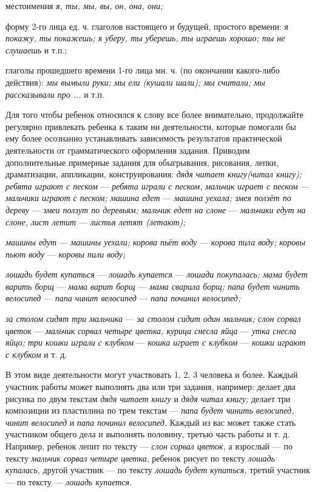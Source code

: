 \documentclass[a5paper]{book}
\renewcommand{\emph}[1]{\textit{#1}}
\begin{document}
местоимения \emph{я, ты, мы, вы, он, она, они;}

форму 2-го лица ед. ч. глаголов настоящего и будущей, простого времени:
я \emph{покажу, ты покажешь; я уберу, ты уберешь, ты играешь хорошо; ты
не слушаешь} и т.п.;

глаголы прошедшего времени 1-го лица мн. ч. (по окончании какого-либо
действия): \emph{мы вымыли руки; мы ели (кушали шали); мы считали; мы
рассказывали про ...} и т.п.

Для того чтобы ребенок относился к слову все более внимательно,
продолжайте регулярно привлекать ребенка к таким ни деятельности,
которые помогали бы ему более осознанно устанавливать зависимость
результатов практической деятельности от грамматического оформления
задания. Приводим дополнительные примерные задания для обыгрывания,
рисования, лепки, драматизации, аппликации, конструирования: \emph{дядя
читает книгу(читал книгу); ребята играют с песком} --- \emph{ребята
играли с песком,} \emph{мальчик играет с песком} --- \emph{мальчики
играют с песком; машина едет} --- \emph{машина уехала; змея ползёт по
дереву} --- \emph{змеи ползут по деревьям; мальчик едет на слоне} ---
\emph{мальчики едут на слоне, лист летит} --- \emph{листья летят
(летают);}

\emph{машины едут} --- \emph{машины уехали; корова пьёт воду} ---
\emph{корова пила воду; коровы пьют воду} --- \emph{коровы пили воду;}

\emph{лошадь будет купаться} --- \emph{лошадь купается} --- \emph{лошади
покупалась; мама будет варить борщ} --- \emph{мама варит борщ} ---
\emph{мама сварила борщ; папа будет чинить велосипед} --- \emph{папа
чинит велосипед} --- \emph{папа починил велосипед;}

\emph{за столом сидят три мальчика} --- \emph{за столом сидит один
мальчик; слон сорвал цветок} --- \emph{мальчик сорвал четыре цветка,
курица снесла яйца} --- \emph{утка снесла яйцо; три кошки играли}
\emph{с клубком} --- \emph{кошка играет с клубком} --- \emph{кошки
играют с клубком} и т. д.

В этом виде деятельности могут участвовать 1, 2, 3 человека и более.
Каждый участник работы может выполнять два или три задания, например:
делает два рисунка по двум текстам \emph{дядя читает книгу} и \emph{дядя
читал книгу;} делает три композиции из пластилина по трем текстам ---
\emph{папа будет чинить велосипед, чинит велосипед} и \emph{папа починил
велосипед.} Каждый из вас может также стать участником общего дела и
выполнять половину, третью часть работы и т. д. Например, ребенок лепит
по тексту --- \emph{слон сорвал цветок,} а взрослый --- по тексту
\emph{мальчик сорвал четыре цветка}, ребенок рисует по тексту
\emph{лошадь купалась,} другой участник --- по тексту \emph{лошадь будет
купаться,} третий участник --- по тексту --- \emph{лошадь купается.}
\end{document}
